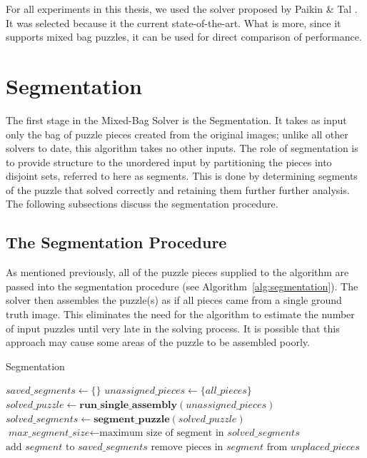 For all experiments in this thesis, we used the solver proposed by Paikin \& Tal \cite{paikin2015}.  It was selected because it the current state-of-the-art.  What is more, since it supports mixed bag puzzles, it can be used for direct comparison of performance.

\section{Segmentation}\label{sec:Segmentation}

The first stage in the Mixed-Bag Solver is the Segmentation.  It takes as input only the bag of puzzle pieces created from the original images; unlike all other solvers to date, this algorithm takes no other inputs.  The role of segmentation is to provide structure to the unordered input by partitioning the pieces into disjoint sets, referred to here as segments.  This is done by determining segments of the puzzle that solved correctly and retaining them further further analysis.  The following subsections discuss the segmentation procedure.

\subsection{The Segmentation Procedure}


As mentioned previously, all of the puzzle pieces supplied to the algorithm are passed into the segmentation procedure (see Algorithm~\ref{alg:segmentation}).  The solver then assembles the puzzle(s) as if all pieces came from a single ground truth image.  This eliminates the need for the algorithm to estimate the number of input puzzles until very late in the solving process.  It is possible that this approach may cause some areas of the puzzle to be assembled poorly. 


\begin{algorithm}
\caption{Segmentation}\label{alg:segmentation}
\begin{algorithmic}[1]
    \State $\textit{saved\_segments} \gets \{ \}$
    \State $\textit{unassigned\_pieces} \gets \{ \textit{all\_pieces} \}$
    \Do
        \State $\textit{solved\_puzzle} \gets \textbf{run\_single\_assembly}(\textit{unassigned\_pieces})$
        \State $\textit{solved\_segments} \gets \textbf{segment\_puzzle}(\textit{solved\_puzzle})$
        \State $\textit{max\_segment\_size} \gets \text{maximum size of segment in } \textit{solved\_segments}$
                \State $\text{add } \textit{segment} \text{ to } \textit{saved\_segments}$
                \State $\text{remove pieces in } \textit{segment} \text{ from } \textit{unplaced\_pieces}$
            \EndIf
        \EndFor
\EndProcedure
\end{algorithmic}
\end{algorithm}

